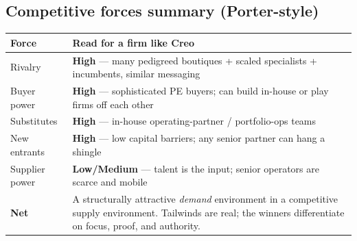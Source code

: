 \documentclass[11pt]{article}
\begin{document}
\subsection{Competitive forces summary (Porter-style)}
\begin{center}
\renewcommand{\arraystretch}{1.3}
\begin{tabular}{p{4.0cm} p{9.2cm}}
\toprule
\textbf{Force} & \textbf{Read for a firm like Creo} \\
\midrule
Rivalry & \textbf{High} --- many pedigreed boutiques + scaled specialists + incumbents, similar messaging \\
Buyer power & \textbf{High} --- sophisticated PE buyers; can build in-house or play firms off each other \\
Substitutes & \textbf{High} --- in-house operating-partner / portfolio-ops teams \\
New entrants & \textbf{High} --- low capital barriers; any senior partner can hang a shingle \\
Supplier power & \textbf{Low/Medium} --- talent is the input; senior operators are scarce and mobile \\
\midrule
\textbf{Net} & A structurally attractive \emph{demand} environment in a competitive supply
environment. Tailwinds are real; the winners differentiate on focus, proof, and authority. \\
\bottomrule
\end{tabular}
\end{center}

\end{document}
